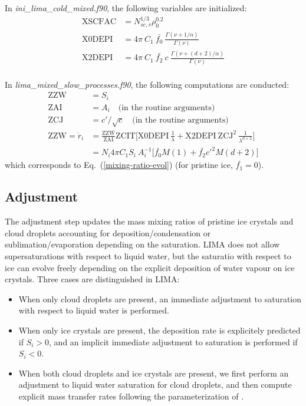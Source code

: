 {In \emph{ini\_lima\_cold\_mixed.f90}, the following variables are initialized:
\begin{align}
 \mathrm{XSCFAC} &= N_{sc,v}^{1/3} \rho_0^{0.2} \\
 \mathrm{X0DEPI} &= 4 \pi ~ C_1 ~ \bar{f_0} ~ \frac{\Gamma(\nu+1/\alpha)}{\Gamma(\nu)} \\
 \mathrm{X2DEPI} &= 4 \pi ~ C_1 ~ \bar{f_2} ~ c ~ \frac{\Gamma(\nu+(d+2)/\alpha)}{\Gamma(\nu)} \\
\end{align}

In \emph{lima\_mixed\_slow\_processes.f90}, the following computations are conducted:
\begin{align}
 \mathrm{ZZW} &= S_i \\
 \mathrm{ZAI} &= A_i \quad \text{(in the routine arguments)} \\
 \mathrm{ZCJ} &= c'/\sqrt{c} \quad \text{(in the routine arguments)} \\
 \mathrm{ZZW} = \dot{r}_i &= \frac{\mathrm{ZZW}}{\mathrm{ZAI}} \mathrm{ZCIT} \bigg[\mathrm{X0DEPI} ~ \frac{1}{\lambda} + \mathrm{X2DEPI} ~ \mathrm{ZCJ}^2 ~ \frac{1}{\lambda^{d+2}}\bigg]  \\
 &= N_i 4 \pi C_1 S_i~A_i^{-1} \bigg[ \bar{f_0} M(1) + \bar{f_2} c'^2 M(d+2) \bigg]
 \end{align}
which corresponds to Eq.\ (\ref{mixing-ratio-evol}) (for pristine ice, $\bar{f_1}=0$).

\subsection{Adjustment}

The adjustment step updates the mass mixing ratios of pristine ice crystals and cloud droplets accounting for deposition/condensation or sublimation/evaporation depending on the saturation. LIMA does not allow supersaturations with respect to liquid water, but the saturatio with respect to ice can evolve freely depending on the explicit deposition of water vapour on ice crystals. Three cases are distinguished in LIMA:
\begin{itemize}
 \item When only cloud droplets are present, an immediate adjustment to saturation with respect to liquid water is performed. 
 \item When only ice crystals are present, the deposition rate is explicitely predicted if $S_i>0$, and an implicit immediate adjustment to saturation is performed if $S_i<0$.
 \item When both cloud droplets and ice crystals are present, we first perform an adjustment to liquid water saturation for cloud droplets, and then compute explicit mass transfer rates following the parameterization of \citet[][Section 2b4 and appendix B]{Reisin1996}.
\end{itemize}

}
